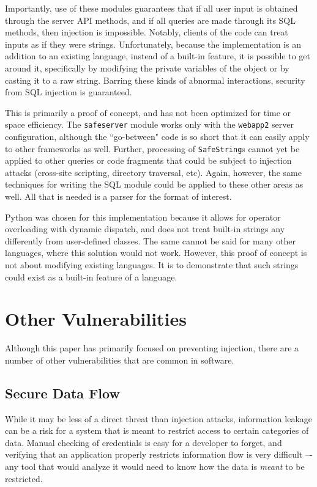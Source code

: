 \documentclass[twocolumn]{article}
\begin{document}
Importantly, use of these modules guarantees that if all user input is obtained through the server API methods, and if all queries are made through its SQL methods, then injection is impossible.  Notably, clients of the code can treat inputs as if they were strings.  Unfortunately, because the implementation is an addition to an existing language, instead of a built-in feature, it is possible to get around it, specifically by modifying the private variables of the object or by casting it to a raw string.  Barring these kinds of abnormal interactions, security from SQL injection is guaranteed.

This is primarily a proof of concept, and has not been optimized for time or space efficiency.  The \verb;safeserver; module works only with the \verb;webapp2; server configuration, although the ``go-between" code is so short that it can easily apply to other frameworks as well.  Further, processing of \verb;SafeString;s cannot yet be applied to other queries or code fragments that could be subject to injection attacks (cross-site scripting, directory traversal, etc).  Again, however, the same techniques for writing the SQL module could be applied to these other areas as well.  All that is needed is a parser for the format of interest.

Python was chosen for this implementation because it allows for operator overloading with dynamic dispatch, and does not treat built-in strings any differently from user-defined classes.  The same cannot be said for many other languages, where this solution would not work.  However, this proof of concept is not about modifying existing languages.  It is to demonstrate that such strings could exist as a built-in feature of a language.


\section{Other Vulnerabilities}
Although this paper has primarily focused on preventing injection, there are a number of other vulnerabilities that are common in software.

\subsection{Secure Data Flow}
While it may be less of a direct threat than injection attacks, information leakage can be a risk for a system that is meant to restrict access to certain categories of data.  Manual checking of credentials is easy for a developer to forget, and verifying that an application properly restricts information flow is very difficult –- any tool that would analyze it would need to know how the data is \textit{meant} to be restricted.
\end{document}
